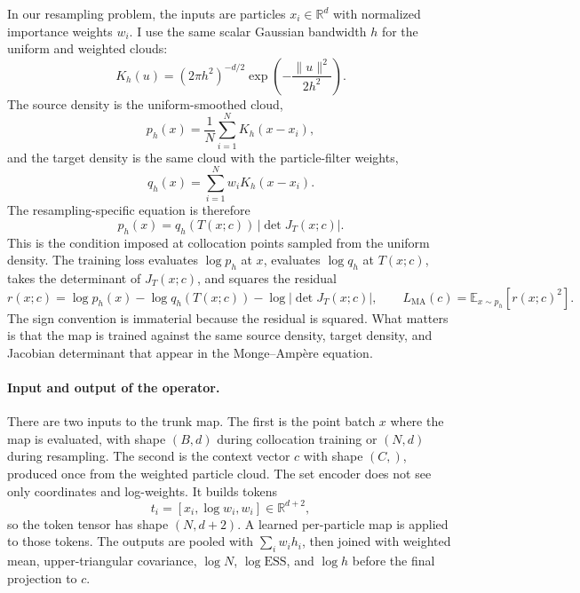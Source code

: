 In our resampling problem, the inputs are particles $x_i\in\mathbb{R}^d$ with normalized importance weights $w_i$. I use the same scalar Gaussian bandwidth $h$ for the uniform and weighted clouds:
\begin{equation}
    K_h(u) = (2\pi h^2)^{-d/2}\exp\!\left(-\frac{\|u\|^2}{2h^2}\right).
\end{equation}
The source density is the uniform-smoothed cloud,
\begin{equation}
    p_h(x) = \frac{1}{N}\sum_{i=1}^{N} K_h(x-x_i),
\end{equation}
and the target density is the same cloud with the particle-filter weights,
\begin{equation}
    q_h(x) = \sum_{i=1}^{N} w_i K_h(x-x_i).
\end{equation}
The resampling-specific equation is therefore
\begin{equation}
    p_h(x) = q_h(T(x;c))\,\left|\det J_T(x;c)\right|.
\end{equation}
This is the condition imposed at collocation points sampled from the uniform density. The training loss evaluates $\log p_h$ at $x$, evaluates $\log q_h$ at $T(x;c)$, takes the determinant of $J_T(x;c)$, and squares the residual
\begin{equation}
    r(x;c) =
    \log p_h(x)
    - \log q_h(T(x;c))
    - \log\left|\det J_T(x;c)\right|,
    \qquad
    L_{\mathrm{MA}}(c) =
    \mathbb{E}_{x\sim p_h}\!\left[r(x;c)^2\right].
\end{equation}
The sign convention is immaterial because the residual is squared. What matters is that the map is trained against the same source density, target density, and Jacobian determinant that appear in the Monge--Amp\`ere equation.

\paragraph{Input and output of the operator.}
There are two inputs to the trunk map. The first is the point batch $x$ where the map is evaluated, with shape $(B,d)$ during collocation training or $(N,d)$ during resampling. The second is the context vector $c$ with shape $(C,)$, produced once from the weighted particle cloud. The set encoder does not see only coordinates and log-weights. It builds tokens
\begin{equation}
    t_i = [x_i,\log w_i,w_i] \in \mathbb{R}^{d+2},
\end{equation}
so the token tensor has shape $(N,d+2)$. A learned per-particle map is applied to those tokens. The outputs are pooled with $\sum_i w_i h_i$, then joined with weighted mean, upper-triangular covariance, $\log N$, $\log\mathrm{ESS}$, and $\log h$ before the final projection to $c$.


